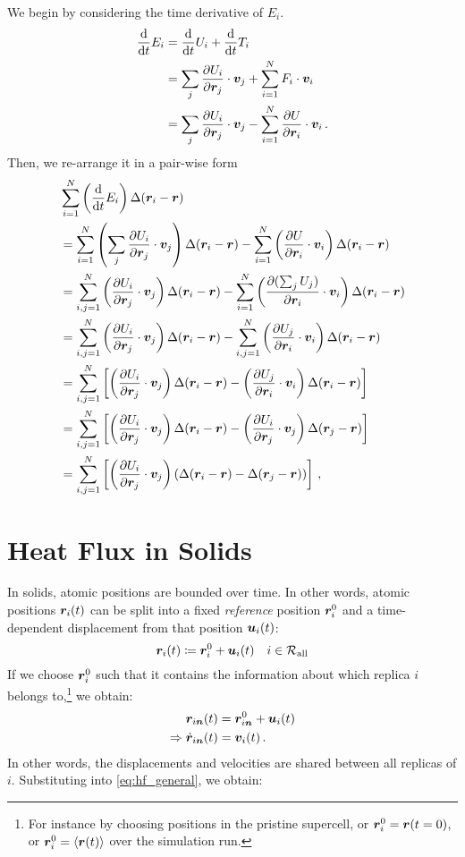 We begin by considering the time derivative of $E_i$.
\begin{align}
	\totaldiff{t} E_i &= \totaldiff{t} U_i + \totaldiff{t} T_i \\
	&= \sum_j \dur{i}{j}{} \cdot \V_j + \sum_{i=1}^N F_i \cdot \V_i \\
	&= \sum_j \dur{i}{j}{} \cdot \V_j - \sum_{i=1}^N \dur{}{i}{} \cdot \V_i \, .
\end{align}
Then, we re-arrange it in a pair-wise form
\begin{align}
	&\sum_{i=1}^N \left(\totaldiff{t} E_i\right) \localf{\R_i - \R}  \\
	&= \sum_{i=1}^N \left(\sum_j \dur{i}{j}{} \cdot \V_j \right) \localf{\R_i - \R} 
	- \sum_{i=1}^N \left(\dur{}{i}{} \cdot \V_i \right) \localf{\R_i - \R} \\
	&= \sum_{i,j=1}^N \left(\dur{i}{j}{} \cdot \V_j \right) \localf{\R_i - \R} 
	- \sum_{i=1}^N \left(\frac{\partial (\sum_j\nolimits U_j)}{\partial \R_i} \cdot \V_i \right) \localf{\R_i - \R} \\
	&= \sum_{i,j=1}^N \left(\dur{i}{j}{} \cdot \V_j \right) \localf{\R_i - \R} 
	- \sum_{i,j=1}^N \left(\dur{j}{i}{} \cdot \V_i \right) \localf{\R_i - \R}  \\
	&= \sum_{i,j=1}^N \left[ \left(\dur{i}{j}{} \cdot \V_j \right) \localf{\R_i - \R}
	-  \left(\dur{j}{i}{} \cdot \V_i \right) \localf{\R_i - \R} \right] \\
	&= \sum_{i,j=1}^N \left[ \left(\dur{i}{j}{} \cdot \V_j \right) \localf{\R_i - \R}
	-  \left(\dur{i}{j}{} \cdot \V_j \right) \localf{\R_j - \R} \right] \\
	&= \sum_{i,j=1}^N \left[\left(\dur{i}{j}{} \cdot \V_j\right)  \left(\localf{\R_i - \R} - \localf{\R_j - \R}\right) \right] \, ,
\end{align}

\section{Heat Flux in Solids}
\label{sec:si-hf_solids}
In solids, atomic positions are bounded over time. In other words, atomic positions $\R_i(t)$ can be split into a fixed \emph{reference} position $\Rr_i$ and a time-dependent displacement from that position $\U_i(t)$:
\begin{equation}
	\R_{i}(t) \defas \Rr_{i} + \U_i(t) \quad i \in \Rall \\
\end{equation}
If we choose $\Rr_i$ such that it contains the information about which replica $i$ belongs to,\footnote{For instance by choosing positions in the pristine supercell, or $\Rr_i = \R(t=0)$, or $\Rr_i = \braket{\R(t)}$ over the simulation run.} we obtain:
\begin{align}
	\R_{i\offset}(t) &= \Rr_{i\offset} + \U_i(t) \\
	\Rightarrow \dot \R_{i\offset}(t) &= \V_i(t) \, .
\end{align}
In other words, the displacements and velocities are shared between all replicas of $i$. Substituting into \cref{eq:hf_general}, we obtain:

